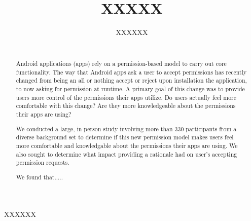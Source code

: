 \documentclass{sig-alternate-05-2015}
\begin{document}
\title{XXXXX}


\author{
%
\alignauthor
XXXXXX 	\\
       \\
       \alignauthor
} %




\maketitle
\begin{abstract}



Android applications (apps) rely on a permission-based model to carry out core functionality. The way that Android apps ask a user to accept permissions has recently changed from being an all or nothing accept or reject upon installation the application, to now asking for permission at runtime. A primary goal of this change was to provide users more control of the permissions their apps utilize. Do users actually feel more comfortable with this change? Are they more knowledgeable about the permissions their apps are using? 

We conducted a large, in person study involving more than 330 participants from a diverse background set to determine if this new permission model makes users feel more comfortable and knowledgable about the permissions their apps are using. We also sought to determine what impact providing a rationale had on user's accepting permission requests.

We found that.....




\end{abstract}

\begin{keywords}

XXXXXX

\end{keywords}
\end{document}
